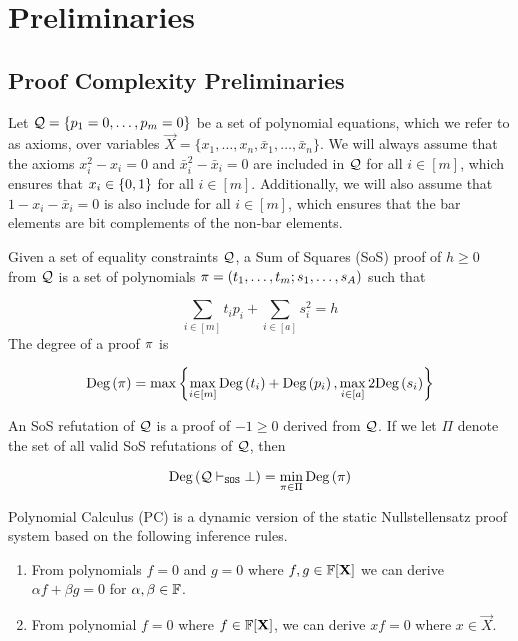 \documentclass[11pt]{article}
\begin{document}
\section{Preliminaries}
\label{sec:prelims}


\subsection{Proof Complexity Preliminaries}
\label{sec:proof-system-prelims}

Let $\mathcal{Q} = \{ p_1 = 0, \dots, p_m = 0\}$ be a set of polynomial equations, which we refer to as axioms, over variables $\vec{X} = \{x_1, \dots, x_n, \bar{x}_1, \dots, \bar{x}_n\}$.
We will always assume that the axioms $x_i^2 - x_i = 0$ and $\bar{x}_i^2 - \bar{x}_i = 0$ are included in $\mathcal{Q}$ for all $i \in [m]$, which ensures that $x_i \in \{0,1\}$ for all $i\in [m]$.
Additionally, we will also assume that $1 - x_i - \bar{x}_i=0$ is also include for all $i \in [m]$, which ensures that the bar elements are bit complements of the non-bar elements.

\begin{definition}\label{def:sum-of-squares} Given a set of equality constraints $\mathcal{Q}$, a Sum of Squares (SoS) proof of $h \geq 0$ from $\mathcal{Q}$ is a set of polynomials $\pi = (t_1, \dots, t_m; s_1, \dots, s_A)$ such that

\[ \sum_{i \in [m]} t_ip_i+ \sum_{i \in [a]} s_i^2 = h\]
The degree of a proof $\pi$ is

\[ \text{Deg}\left(\pi\right) = \max\left\{\max_{i \in [m]} \text{Deg}\left(t_i\right) + \text{Deg}\left(p_i\right), \max_{i \in [a]} 2\text{Deg}\left(s_i\right)\right\}\]


\end{definition}


\begin{definition}
An SoS refutation of $\mathcal{Q}$ is a proof of $-1 \geq 0$ derived from $\mathcal{Q}$. If we let $\Pi$ denote the set of all valid SoS refutations of $\mathcal{Q}$, then

\[ \text{Deg}\left(\mathcal{Q} \vdash_{\texttt{SOS}} \bot\right) = \min_{\pi \in \Pi}\text{Deg}\left(\pi\right)\]

\end{definition}

Polynomial Calculus (PC) is a dynamic version of the static Nullstellensatz proof system \citep[Section 1.3]{fleming2019semialgebraic} based on the following inference rules.
\begin{enumerate}
	\item From polynomials $f=0$ and $g=0$ where $f,g \in \mathbb{F}[\mathbf{X}]$ we can derive $\alpha f + \beta g = 0$ for $\alpha, \beta \in \mathbb{F}$.
	\item From polynomial $f=0$ where $f \in \mathbb{F}[\mathbf{X}]$, we can derive $xf=0$ where $x \in \vec{X}$.
\end{enumerate}
\end{document}
